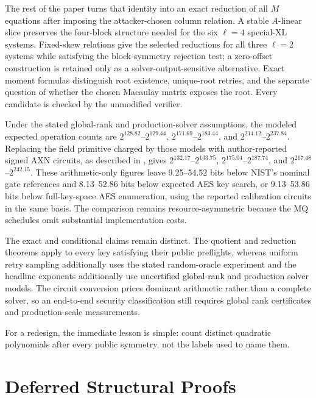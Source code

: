 \documentclass[11pt]{article}
\newcommand{\LoneModelRange}{$2^{128.82}$--$2^{129.44}$}
\newcommand{\LthreeModelRange}{$2^{171.69}$--$2^{183.44}$}
\newcommand{\LfiveModelRange}{$2^{214.12}$--$2^{237.84}$}
\newcommand{\LoneAXNRange}{$2^{132.17}$--$2^{133.75}$}
\newcommand{\LthreeAXNRange}{$2^{175.04}$--$2^{187.74}$}
\newcommand{\LfiveAXNRange}{$2^{217.48}$--$2^{242.15}$}
\newcommand{\AXNNominalGapRange}{9.25--54.52}
\newcommand{\AXNExpectedAESGapRange}{8.13--52.86}
\newcommand{\AXNFullAESGapRange}{9.13--53.86}
\begin{document}
The rest of the paper turns that identity into an exact reduction of all $M$
equations after imposing the attacker-chosen column relation.  A stable
$A$-linear slice preserves
the four-block structure needed for the six $\ell=4$ special-XL systems.
Fixed-skew relations give the selected reductions for all three $\ell=2$
systems while satisfying the block-symmetry rejection test; a zero-offset construction is
retained only as a solver-output-sensitive alternative.  Exact moment formulas distinguish root
existence, unique-root retries, and the separate question of whether the
chosen Macaulay matrix exposes the root.  Every candidate is checked by the
unmodified verifier.

Under the stated global-rank and production-solver assumptions, the modeled
expected operation counts are \LoneModelRange, \LthreeModelRange, and
\LfiveModelRange.  Replacing the field primitive charged by those models with
author-reported signed AXN circuits, as described in
, gives
\LoneAXNRange, \LthreeAXNRange, and
\LfiveAXNRange.  These arithmetic-only figures leave
\AXNNominalGapRange{} bits below NIST's nominal gate references and
\AXNExpectedAESGapRange{} bits below expected AES key search, or
\AXNFullAESGapRange{} bits below full-key-space AES enumeration, using the
reported calibration circuits in the same basis.  The comparison remains
resource-asymmetric because the MQ schedules omit substantial implementation
costs.

The exact and conditional claims remain distinct.  The quotient and reduction
theorems apply to every key satisfying their public preflights, whereas uniform
retry sampling additionally uses the stated random-oracle experiment and the
headline exponents additionally use uncertified global-rank and production
solver models.  The circuit conversion prices dominant arithmetic rather than
a complete solver, so an end-to-end security classification still requires
global rank certificates and production-scale measurements.

For a redesign, the immediate lesson is simple: count distinct quadratic
polynomials after every public symmetry, not the labels used to name them.

\appendix
\setcounter{section}{0}
\renewcommand{\thesection}{\Alph{section}}
\renewcommand{\theHsection}{app.\Alph{section}}


\section{Deferred Structural Proofs}\label{app:deferred-proofs}
\end{document}
